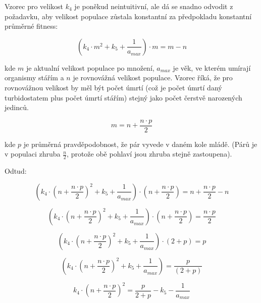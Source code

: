 \begin{tcolorbox}[ title={Odvození vzorce pro $k_4$}
                 , breakable
                 ]

Vzorec pro velikost $k_4$ je poněkud neintuitivní, ale dá se snadno odvodit z požadavku, aby velikost populace zůstala
konstantní za předpokladu konstantní průměrné fitness:

\begin{equation}
(k_4\cdot{m^2} + {k_5} + \frac{1}{a_{max}})\cdot{m} = m - n
\end{equation}

kde $m$ je aktualní velikost populace po množení, $a_{max}$ je věk, ve kterém umírají organismy stářím a $n$ je rovnovážná
velikost populace. Vzorec říká, že pro rovnovážnou velikost by měl být počet úmrtí (což je počet úmrtí daný
turbidostatem plus počet úmrtí stářím) stejný jako počet čerstvě narozených jedinců.

\begin{equation}
m = n + \frac{n\cdot{}p}{2}
\end{equation}

kde $p$ je průměrná pravděpodobnost, že pár vyvede v daném kole mládě. (Párů je v populaci zhruba $\frac{n}{2}$, protože
obě pohlaví jsou zhruba stejně zastoupena).

Odtud:

\begin{equation}
(k_4\cdot{(n + \frac{n\cdot{}p}{2})^2} + {k_5} + \frac{1}{a_{max}})\cdot{(n + \frac{n\cdot{}p}{2})}
        = n + \frac{n\cdot{}p}{2}  - n
\end{equation}

\begin{equation}
(k_4\cdot{(n + \frac{n\cdot{}p}{2})^2} + {k_5} + \frac{1}{a_{max}})\cdot{(n + \frac{n\cdot{}p}{2})} = \frac{n\cdot{}p}{2}
\end{equation}

\begin{equation}
(k_4\cdot{(n + \frac{n\cdot{}p}{2})^2} + {k_5} + \frac{1}{a_{max}})\cdot{(2 + p)} = p
\end{equation}


\begin{equation}
(k_4\cdot{(n + \frac{n\cdot{}p}{2})^2} + {k_5} + \frac{1}{a_{max}}) = \frac{p}{(2 + p)}
\end{equation}

\begin{equation}
k_4\cdot{(n + \frac{n\cdot{}p}{2})^2} = \frac{p}{2 + p} -  {k_5} - \frac{1}{a_{max}}
\end{equation}


\end{tcolorbox}
